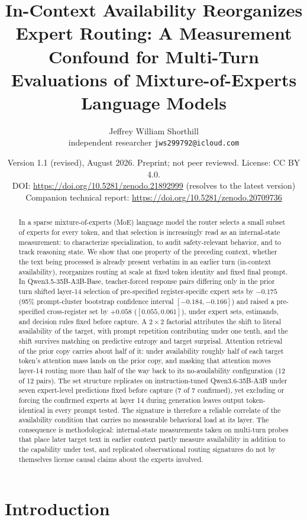 \documentclass[10pt,a4paper,twocolumn]{article}
\title{\textbf{In-Context Availability Reorganizes Expert Routing: A Measurement Confound for Multi-Turn Evaluations of Mixture-of-Experts Language Models}}
\author{Jeffrey William Shorthill\\
\small independent researcher \quad \texttt{jws299792@icloud.com}}
\date{\small Version 1.1 (revised), August 2026. Preprint; not peer reviewed. License: CC BY 4.0.\\
\small DOI: \url{https://doi.org/10.5281/zenodo.21892999} (resolves to the latest version)\\
\small Companion technical report: \url{https://doi.org/10.5281/zenodo.20709736}}
\begin{document}
\maketitle

\begin{abstract}
In a sparse mixture-of-experts (MoE) language model the router selects a
small subset of experts for every token, and that selection is increasingly
read as an internal-state measurement: to characterize specialization, to
audit safety-relevant behavior, and to track reasoning state. We show that
one property of the preceding context, whether the text being processed is
already present verbatim in an earlier turn (in-context availability),
reorganizes routing at scale at fixed token identity and fixed final
prompt. In Qwen3.5-35B-A3B-Base, teacher-forced
response pairs differing only in the prior turn shifted layer-14 selection of
pre-specified register-specific expert sets by \(-0.175\) (95\% prompt-cluster
bootstrap confidence interval \([-0.184,-0.166]\)) and raised a pre-specified
cross-register set by \(+0.058\) (\([0.055,0.061]\)), under expert sets,
estimands, and decision rules fixed before capture. A \(2\times2\) factorial
attributes the shift to literal availability of the target, with prompt
repetition contributing under one tenth, and the shift survives matching on predictive entropy and target surprisal. Attention
retrieval of the prior copy carries about half of it: under availability
roughly half of each target token's attention mass lands on the prior copy,
and masking that attention moves layer-14 routing more than half of the way
back to its no-availability configuration (12 of 12 pairs). The set structure
replicates on instruction-tuned Qwen3.6-35B-A3B under seven expert-level
predictions fixed before capture (7 of 7 confirmed), yet excluding or forcing
the confirmed experts at layer 14 during generation leaves output
token-identical in every prompt tested. The signature is therefore a reliable
correlate of the availability condition that carries no measurable behavioral
load at its layer. The consequence is methodological: internal-state
measurements taken on multi-turn probes that place later target text in
earlier context partly measure availability in addition to the capability
under test, and replicated observational routing signatures do not by themselves
license causal claims about the experts involved.
\end{abstract}

\section{Introduction}
\end{document}
